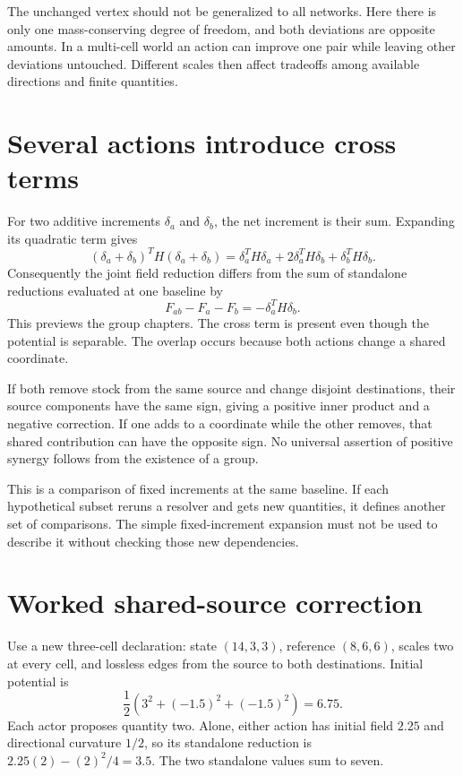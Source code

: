 The unchanged vertex should not be generalized to all networks. Here there is only one mass-conserving degree of freedom, and both deviations are opposite amounts. In a multi-cell world an action can improve one pair while leaving other deviations untouched. Different scales then affect tradeoffs among available directions and finite quantities.

\section{Several actions introduce cross terms}
For two additive increments \(\delta_a\) and \(\delta_b\), the net increment is their sum. Expanding its quadratic term gives
\begin{equation}
 (\delta_a+\delta_b)^TH(\delta_a+\delta_b)
 =\delta_a^TH\delta_a+2\delta_a^TH\delta_b+\delta_b^TH\delta_b.
\end{equation}
Consequently the joint field reduction differs from the sum of standalone reductions evaluated at one baseline by
\begin{equation}
 F_{ab}-F_a-F_b=-\delta_a^TH\delta_b.
\end{equation}
This previews the group chapters. The cross term is present even though the potential is separable. The overlap occurs because both actions change a shared coordinate.

If both remove stock from the same source and change disjoint destinations, their source components have the same sign, giving a positive inner product and a negative correction. If one adds to a coordinate while the other removes, that shared contribution can have the opposite sign. No universal assertion of positive synergy follows from the existence of a group.

This is a comparison of fixed increments at the same baseline. If each hypothetical subset reruns a resolver and gets new quantities, it defines another set of comparisons. The simple fixed-increment expansion must not be used to describe it without checking those new dependencies.

\section{Worked shared-source correction}
Use a new three-cell declaration: state \((14,3,3)\), reference \((8,6,6)\), scales two at every cell, and lossless edges from the source to both destinations. Initial potential is
\begin{equation}
 \frac12\left(3^2+(-1.5)^2+(-1.5)^2\right)=6.75.
\end{equation}
Each actor proposes quantity two. Alone, either action has initial field \(2.25\) and directional curvature \(1/2\), so its standalone reduction is \(2.25(2)-(2)^2/4=3.5\). The two standalone values sum to seven.

